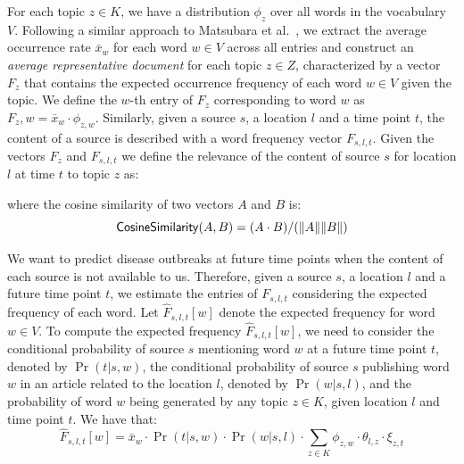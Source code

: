 \documentclass[twoside,leqno,twocolumn]{article}
\begin{document}
For each topic $z \in K$, we have a distribution $\phi_z$ over all words in the vocabulary $V$. Following a similar approach to Matsubara et al.~\cite{matsubara:2012}, we extract the average occurrence rate $\bar{x}_w$ for each word $w \in V$ across all entries and construct an {\em average representative document} for each topic $z \in Z$, characterized by a vector $F_z$ that contains the expected occurrence frequency of each word $w \in V$ given the topic. We define the $w$-th entry of $F_z$ corresponding to word $w$ as $F_z,w = \bar{x}_w \cdot \phi_{z,w}$. Similarly, given a source $s$,  a location $l$ and a time point $t$, the content of a source is described with a word frequency vector $F_{s,l,t}$. Given the vectors $F_z$ and $F_{s,l,t}$ we define the relevance of the content of source $s$ for location $l$ at time $t$ to topic $z$ as:

\vspace{-10pt}

where the cosine similarity of two vectors $A$ and $B$ is:
{\small \begin{equation}
{\sf CosineSimilarity}(A,B) = (A \cdot B)/(\|A\| \|B\|)
\end{equation}}
\vspace{-10pt}
 
We want to predict disease outbreaks at future time points when the content of each source is not available to us. Therefore, given a source $s$, a location $l$ and a future time point $t$, we estimate the entries of $F_{s,l,t}$ considering the expected frequency of each word. Let $\hat{F}_{s,l,t}[w]$ denote the expected frequency for word 
$w \in V$. To compute the expected frequency $\hat{F}_{s,l,t}[w]$, we need to consider the conditional probability of source $s$ mentioning word $w$ at a future time point $t$, denoted by $\Pr(t|s,w)$, the conditional probability of source $s$ publishing word $w$ in an article related to the location $l$, denoted by $\Pr(w|s,l)$, and 
the probability of word $w$ being generated by any topic $z \in K$, given location $l$ and time point $t$. 
We have that:
{\small \begin{equation}
  \hat{F}_{s,l,t}[w] = \bar{x}_{w} \cdot \Pr(t|s,w) \cdot \Pr(w|s,l)\cdot \sum_{z \in K}\phi_{z,w}\cdot \theta_{l,z} \cdot \xi_{z,t}
\end{equation}}
\vspace{-10pt}
\end{document}
